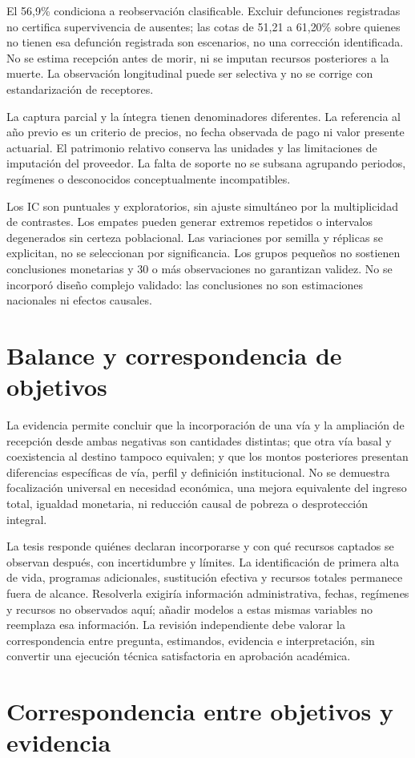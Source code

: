 El 56{,}9\% condiciona a reobservación clasificable. Excluir defunciones
registradas no certifica supervivencia de ausentes; las cotas de 51{,}21 a
61{,}20\% sobre quienes no tienen esa defunción registrada son escenarios,
no una corrección identificada. No se estima recepción antes de morir, ni se
imputan recursos posteriores a la muerte. La observación longitudinal puede
ser selectiva y no se corrige con estandarización de receptores.

La captura parcial y la íntegra tienen denominadores diferentes. La referencia
al año previo es un criterio de precios, no fecha observada de pago ni valor
presente actuarial. El patrimonio relativo conserva las unidades y las
limitaciones de imputación del proveedor. La falta de soporte no se subsana
agrupando periodos, regímenes o desconocidos conceptualmente incompatibles.

Los IC son puntuales y exploratorios, sin ajuste simultáneo por la multiplicidad
de contrastes. Los empates pueden generar extremos repetidos o intervalos
degenerados sin certeza poblacional. Las variaciones por semilla y réplicas
se explicitan, no se seleccionan por significancia. Los grupos pequeños no
sostienen conclusiones monetarias y 30 o más observaciones no garantizan
validez. No se incorporó diseño complejo validado: las conclusiones no son
estimaciones nacionales ni efectos causales.

\section{Balance y correspondencia de objetivos}

La evidencia permite concluir que la incorporación de una vía y la ampliación
de recepción desde ambas negativas son cantidades distintas; que otra vía
basal y coexistencia al destino tampoco equivalen; y que los montos
posteriores presentan diferencias específicas de vía, perfil y definición
institucional. No se demuestra focalización universal en necesidad económica,
una mejora equivalente del ingreso total, igualdad monetaria, ni reducción
causal de pobreza o desprotección integral.

La tesis responde quiénes declaran incorporarse y con qué recursos captados
se observan después, con incertidumbre y límites. La identificación de primera
alta de vida, programas adicionales, sustitución efectiva y recursos totales
permanece fuera de alcance. Resolverla exigiría información administrativa,
fechas, regímenes y recursos no observados aquí; añadir modelos a estas mismas
variables no reemplaza esa información. La revisión independiente debe valorar
la correspondencia entre pregunta, estimandos, evidencia e interpretación,
sin convertir una ejecución técnica satisfactoria en aprobación académica.

\section{Correspondencia entre objetivos y evidencia}

